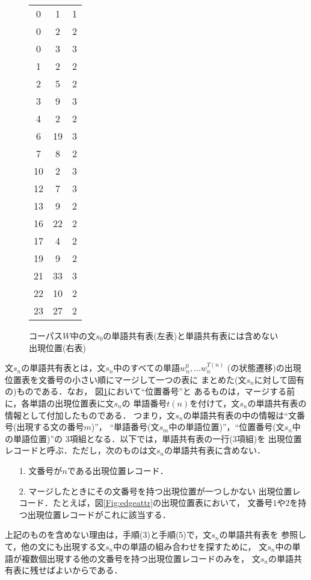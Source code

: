 \begin{figure}[hbt]
\begin{center}
\begin{footnotesize}
\begin{minipage}[t]{5cm}
\begin{tabular}[t]{|c|c|c|}
	0 & 1 & 1\\
	0 & 2 & 2\\
	0 & 3 & 3\\
	1 & 2 & 2\\
	2 & 5 & 2\\
	3 & 9 & 3\\
	4 & 2 & 2\\
	6 & 19 & 3\\
	7 & 8 & 2\\
	10 & 2 & 3\\
	12 & 7 & 3\\
	13 & 9 & 2\\
	16 & 22 & 2\\
	17 & 4 & 2\\
	19 & 9 & 2\\
	21 & 33 & 3\\
	22 & 10 & 2\\
	23 & 27 & 2\\
	\end{tabular}
	\end{minipage}
\end{footnotesize}
\end{center}
\caption{コーパス$W$中の文$s_0$の単語共有表(左表)と単語共有表には含めない出現位置(右表)}
\label{Fig:wordkyofile}
\end{figure}
文$s_n$の単語共有表とは，文$s_n$中のすべての単語\hspace{-0.2mm}\(w_n^0,\ldots w_n^{T(n)}\)\hspace{-0.2mm}
(の状態遷移)の出現位置表を文番号の小さい順にマージして一つの表に
まとめた(文$s_n$に対して固有の)ものである．なお，
図\ref{Fig:wordkyofile}において\hspace{-0.2mm}``位置番号''\hspace{-0.2mm}と
あるものは，マージする前に，各単語の出現位置表に文$s_n$の
単語番号$t(n)$を付けて，文$s_n$の単語共有表の情報として付加したものである．
つまり，文$s_n$の単語共有表の中の情報は``文番号(出現する文の番号$m$)''，
``単語番号(文$s_m$中の単語位置)''，``位置番号(文$s_n$中の単語位置)''の
3項組となる．以下では，単語共有表の一行(3項組)を
出現位置レコードと呼ぶ．ただし，次のものは文$s_n$の単語共有表に含めない．
\begin{itemize}
\item[1.] 文番号が$n$である出現位置レコード．
\item[2.] マージしたときにその文番号を持つ出現位置が一つしかない
出現位置レコード．たとえば，図\ref{Fig:edgeattr}の出現位置表において，
文番号$1$や$2$を持つ出現位置レコードがこれに該当する．
\end{itemize}
上記のものを含めない理由は，手順(3)と手順(5)で，文$s_n$の単語共有表を
参照して，他の文にも出現する文$s_n$\hspace{-0.2mm}中の単語の組み合わせを探すために，
文$s_n$\hspace{-0.2mm}中の単語が複数個出現する他の文番号を持つ出現位置レコードのみを，
文$s_n$の単語共有表に残せばよいからである．

